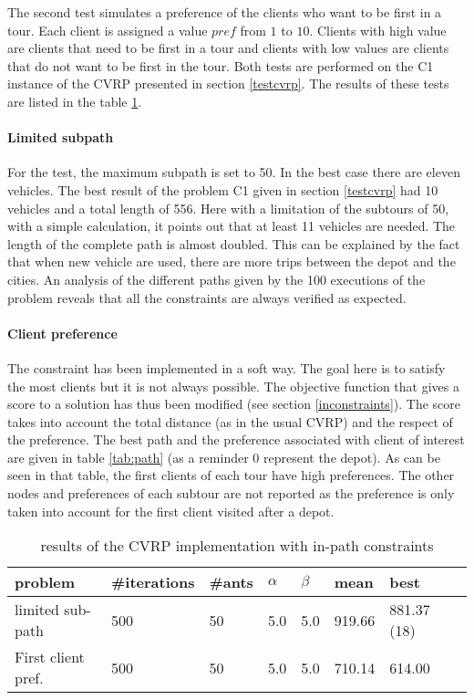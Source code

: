The second test simulates a preference of the clients who want to be first in a tour. Each client is assigned a value $pref$ from $1$ to $10$. Clients with high value are clients that need to be first in a tour and clients with low values are clients that do not want to be first in the tour. Both tests are performed on the C1 instance of the CVRP presented in section \ref{testcvrp}. The results of these tests are listed in the table \ref{tab:vrpin}. 


\paragraph{Limited subpath} For the test, the maximum subpath is set to 50. In the best case there are eleven vehicles. The best result of the problem C1 given in section \ref{testcvrp} had 10 vehicles and a total length of 556. Here with a limitation of the subtours of 50, with a simple calculation, it points out that at least 11 vehicles are needed. The length of the complete path is almost doubled. This can be explained by the fact that when new vehicle are used, there are more trips between the depot and the cities. An analysis of the different paths given by the 100 executions of the problem reveals that all the constraints are always verified as expected.

\paragraph{Client preference} The constraint has been implemented in a soft way. The goal here is to satisfy the most clients but it is not always possible. The objective function that gives a score to a solution has thus been modified (see section \ref{inconstraints}). The score takes into account the total distance (as in the usual CVRP) and the respect of the preference. The best path and the preference associated with client of interest are given in table \ref{tab:path} (as a reminder 0 represent the depot).  As can be seen in that table, the first clients of each tour have high preferences. The other nodes and preferences of each subtour are not reported as the preference is only taken into account for the first client visited after a depot.
\begin{table}
\centering
\small
\begin{tabular}{|l|l|l|l|l|l|l|l|}
\hline
problem & \#iterations & \#ants & $\alpha$ & $\beta$ & mean & best  \\
\hline
\hline
limited sub-path & 500 & 50 & 5.0 & 5.0 & 919.66 & 881.37 (18) \\
\hline
First client pref. & 500 & 50 & 5.0 & 5.0 & 710.14 & 614.00  \\
\hline
\end{tabular}
\caption{results of the CVRP implementation with in-path constraints}
\label{tab:vrpin}
\end{table}


